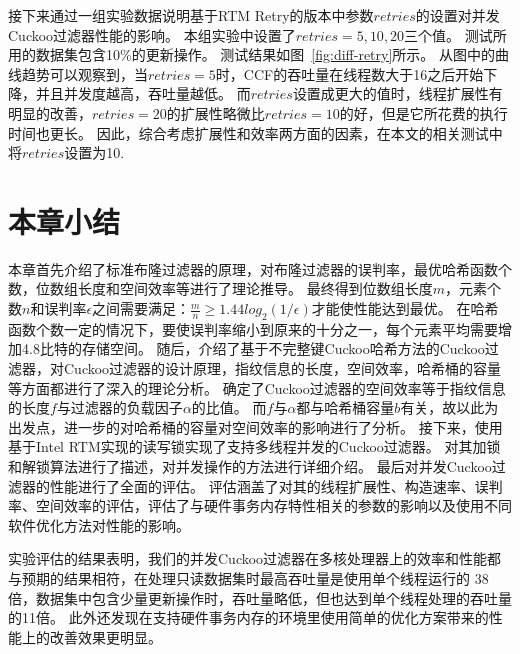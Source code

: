 接下来通过一组实验数据说明基于RTM Retry的版本中参数$retries$的设置对并发Cuckoo过滤器性能的影响。
本组实验中设置了$retries = 5, 10, 20$三个值。
测试所用的数据集包含10\%的更新操作。
测试结果如图~\ref{fig:diff-retry}所示。
从图中的曲线趋势可以观察到，当$retries = 5$时，CCF的吞吐量在线程数大于16之后开始下降，并且并发度越高，吞吐量越低。
而$retries$设置成更大的值时，线程扩展性有明显的改善，$retries = 20$的扩展性略微比$retries = 10$的好，但是它所花费的执行时间也更长。
因此，综合考虑扩展性和效率两方面的因素，在本文的相关测试中将$retries$设置为10.

\section{本章小结}
本章首先介绍了标准布隆过滤器的原理，对布隆过滤器的误判率，最优哈希函数个数，位数组长度和空间效率等进行了理论推导。
最终得到位数组长度$m$，元素个数$n$和误判率$\epsilon$之间需要满足：$\frac{m}{n} \geq 1.44 log_2({1/\epsilon})$才能使性能达到最优。
在哈希函数个数一定的情况下，要使误判率缩小到原来的十分之一，每个元素平均需要增加4.8比特的存储空间。
随后，介绍了基于不完整键Cuckoo哈希方法的Cuckoo过滤器，对Cuckoo过滤器的设计原理，指纹信息的长度，空间效率，哈希桶的容量等方面都进行了深入的理论分析。
确定了Cuckoo过滤器的空间效率等于指纹信息的长度$f$与过滤器的负载因子$\alpha$的比值。
而$f$与$\alpha$都与哈希桶容量$b$有关，故以此为出发点，进一步的对哈希桶的容量对空间效率的影响进行了分析。
接下来，使用基于Intel RTM实现的读写锁实现了支持多线程并发的Cuckoo过滤器。
对其加锁和解锁算法进行了描述，对并发操作的方法进行详细介绍。
最后对并发Cuckoo过滤器的性能进行了全面的评估。
评估涵盖了对其的线程扩展性、构造速率、误判率、空间效率的评估，评估了与硬件事务内存特性相关的参数的影响以及使用不同软件优化方法对性能的影响。

实验评估的结果表明，我们的并发Cuckoo过滤器在多核处理器上的效率和性能都与预期的结果相符，在处理只读数据集时最高吞吐量是使用单个线程运行的
38倍，数据集中包含少量更新操作时，吞吐量略低，但也达到单个线程处理的吞吐量的11倍。
此外还发现在支持硬件事务内存的环境里使用简单的优化方案带来的性能上的改善效果更明显。






